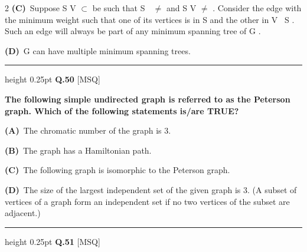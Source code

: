 \documentclass[a4paper,10pt,twoside]{article}
\begin{document}
\begin{multicols}{2}
\textbf{(C)}~Suppose S \newline V \newline $\subset$ \newline be such that S \newline  \newline $\ne$ \newline and S \newline V \newline $\ne$ \newline . Consider the edge with the minimum \newline weight such that one of its vertices is in S and the other in V \ S . Such an edge will \newline always be part of any minimum spanning tree of G .\par\vspace{2pt}\noindent
\textbf{(D)}~G can have multiple minimum spanning trees.
\par\vspace{6pt}\hrule height 0.25pt\vspace{6pt}
\noindent\textbf{Q.50} \hfill {\footnotesize\textsf{[MSQ]}}
\par\vspace{2pt}
{\bfseries The following simple undirected graph is referred to as the Peterson graph.
Which of the following statements is/are TRUE? \par}
\par\vspace{2pt}\noindent
\textbf{(A)}~The chromatic number of the graph is 3.\par\vspace{2pt}\noindent
\textbf{(B)}~The graph has a Hamiltonian path.\par\vspace{2pt}\noindent
\textbf{(C)}~The following graph is isomorphic to the Peterson graph.\par\vspace{2pt}\noindent
\textbf{(D)}~The size of the largest independent set of the given graph is 3. (A subset of vertices \newline of a graph form an independent set if no two vertices of the subset are adjacent.)
\par\vspace{6pt}\hrule height 0.25pt\vspace{6pt}
\noindent\textbf{Q.51} \hfill {\footnotesize\textsf{[MSQ]}}
\par\vspace{2pt}

\end{multicols}
\end{document}
